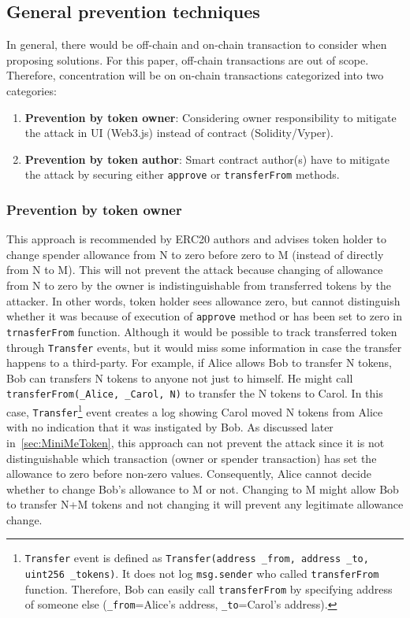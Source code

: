 \subsection{General prevention techniques}

\noindent In general, there would be off-chain and on-chain transaction to consider when proposing solutions. For this paper, off-chain transactions are out of scope. Therefore, concentration will be on on-chain transactions categorized into two categories:
\begin{enumerate}
	\item \textbf{Prevention by token owner}: Considering owner responsibility to mitigate the attack in UI (\eg Web3.js) instead of contract (\ie Solidity/Vyper).
	\item \textbf{Prevention by token author}: Smart contract author(s) have to mitigate the attack by securing either \texttt{approve} or \texttt{transferFrom} methods.
\end{enumerate}

\subsubsection*{Prevention by token owner} This approach is recommended by ERC20 authors \cite{Ref08} and advises token holder to change spender allowance from N to zero before zero to M (instead of directly from N to M). This will not prevent the attack because changing of allowance from N to zero by the owner is indistinguishable from transferred tokens by the attacker. In other words, token holder sees allowance zero, but cannot distinguish whether it was because of execution of \texttt{approve} method or has been set to zero in \texttt{trnasferFrom} function. Although it would be possible to track transferred token through \texttt{Transfer} events, but it would miss some information in case the transfer happens to a third-party. For example, if Alice allows Bob to transfer N tokens, Bob can transfers N tokens to anyone not just to himself. He might call \texttt{transferFrom(\_Alice, \_Carol, N)} to transfer the N tokens to Carol. In this case, \texttt{Transfer}\footnote{\texttt{Transfer} event is defined as \texttt{Transfer(address \_from, address \_to, uint256 \_tokens)}. It does not log \texttt{msg.sender} who called \texttt{transferFrom} function. Therefore, Bob can easily call \texttt{transferFrom} by specifying address of someone else (\texttt{\_from}=Alice's address, \texttt{\_to}=Carol's address).} event creates a log showing Carol moved N tokens from Alice with no indication that it was instigated by Bob. As discussed later in~\ref{sec:MiniMeToken}, this approach can not prevent the attack since it is not distinguishable which transaction (\ie owner or spender transaction) has set the allowance to zero before non-zero values. Consequently, Alice cannot decide whether to change Bob's allowance to M or not. Changing to M might allow Bob to transfer N+M tokens and not changing it will prevent any legitimate allowance change.

